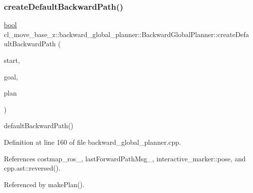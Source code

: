 \mbox{\label{classcl__move__base__z_1_1backward__global__planner_1_1BackwardGlobalPlanner_a1b4d2eb717f9f63f2309def37c6ce297}} 
\subsubsection{\texorpdfstring{create\+Default\+Backward\+Path()}{createDefaultBackwardPath()}}
{\footnotesize\ttfamily \hyperlink{classbool}{bool} cl\+\_\+move\+\_\+base\+\_\+z\+::backward\+\_\+global\+\_\+planner\+::\+Backward\+Global\+Planner\+::create\+Default\+Backward\+Path (\begin{DoxyParamCaption}\item[{const geometry\+\_\+msgs\+::\+Pose\+Stamped \&}]{start,  }\item[{const geometry\+\_\+msgs\+::\+Pose\+Stamped \&}]{goal,  }\item[{std\+::vector$<$ geometry\+\_\+msgs\+::\+Pose\+Stamped $>$ \&}]{plan }\end{DoxyParamCaption})\hspace{0.3cm}{\ttfamily [virtual]}}

default\+Backward\+Path() 

Definition at line 160 of file backward\+\_\+global\+\_\+planner.\+cpp.



References costmap\+\_\+ros\+\_\+, last\+Forward\+Path\+Msg\+\_\+, interactive\+\_\+marker\+::pose, and cpp.\+ast\+::reversed().



Referenced by make\+Plan().


